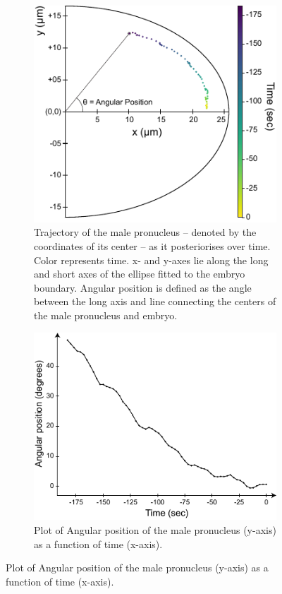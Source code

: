 \begin{figure}[p]
\centering

\begin{subfigure}[t]{0.45\textwidth}
    \centering
    \includegraphics[width=\textwidth]{ExpMethods/FigTrackNucleus/trajectory.pdf}
    \caption{Trajectory of the male pronucleus -- denoted by the coordinates of its center -- as it posteriorises over time. Color represents time. x- and y-axes lie along the long and short axes of the ellipse fitted to the embryo boundary. Angular position is defined as the angle between the long axis and line connecting the centers of the male pronucleus and embryo.} 
    \label{subfig:malePronucleusTrackingResults-trackPronucleus}
\end{subfigure}
\hfill
\begin{subfigure}[t]{0.45\textwidth}
    \centering
    \includegraphics[width=\textwidth]{ExpMethods/FigTrackNucleus/angularPosVsTime.pdf}
    \caption{Plot of Angular position of the male pronucleus (y-axis) as a function of time (x-axis).} 
    \label{subfig:malePronucleusTrackingResults-angularPosVsTime}
\end{subfigure}


\end{figure}
